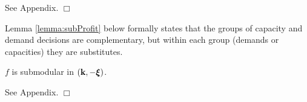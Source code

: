 \documentclass[mnsc,nonblindrev,copyedit]{informs2_wz} %
\newcommand{\proof}{\noindent{\bf Proof: } }
\newcommand{\qed}{ \hfill $\Box$ }
\newcommand{\OUT}[1]{}
\newcommand{\xiv}{\mbox{\boldmath$\xi$}}
\newcommand{\etav}{\mbox{\boldmath$\eta$}}
\newcommand{\lambdav}{\mbox{\boldmath$\lambda$}}
\newcommand{\alphav}{\mbox{\boldmath$\alpha$}}
\begin{document}
\proof See Appendix.  \qed

Lemma \ref{lemma:subProfit} below formally states that the groups of capacity and demand decisions are complementary, but within each group (demands or capacities) they are substitutes.


{\lemma $f$ is submodular in $(\bold k, -\xiv)$.
\label{lemma:subProfit}}

\proof See Appendix.  \qed

\OUT{
\proof For simplicity of the presentation, let $\alpha_{jl}$ be the coefficient of decision variable of objective function in (\ref{eqn:profit}), {\it i.e.}, $\alpha_{dd} = p-c, \; \alpha_{od} = p-cs-t,\; \alpha_{do} = sp -c -t, \; \alpha_{oo} = s(p-c)$.  To prove submodularity, we first write the dual of the production problem:
\begin{equation*}
\begin{array}{lll}
    f(s,\bold k, \xiv) &=& \min_{(\etav, \lambdav) \in B (\alphav)} G (\etav, \lambdav, \bold k ,\xiv)  \\
    G(\etav,\lambdav,\bold k, \xiv) &=& \etav \bold k + \lambdav \xiv \\
    B (\alphav) &=& \{\eta_j+\lambda_l  \leq \alpha_{jl} \; \forall j \in \{d,o\}, \; \forall l \in \{d,o\},\;  \etav \geq 0,\; \lambdav \geq 0 \}
\end{array}
\end{equation*}
To see the relationship between $\bold k$ and $-\xiv$, we substitute $\bar{\xiv} = - \xiv$ and $\bar{\etav} = - \etav$.  Then, the dual problem becomes:
\begin{equation*}
\begin{array}{lll}
    f(s,\bold k, \xiv) &=& \min_{(\bar{\etav}, \lambdav) \in B_1 (\alphav)} G (\bar{\etav}, \lambdav, \bold k ,\bar{\xiv})  \\
    G(\bar{\etav},\lambdav,\bold k, \bar{\xiv}) &=& -\bar{\etav} \bold k - \lambdav \bar{\xiv} \\
     B_1(\alphav) &=& \{-\bar{\eta}_j+\lambda_l  \leq \alpha_{jl} \; \forall j \in \{d,o\}, \; \forall l \in \{d,o\},\;  \bar{\etav} \leq 0,\; \lambdav \geq 0 \}
\end{array}
\end{equation*}
The objective function $G$ is submodular in $(\bar{\etav},\bold k,\lambdav, \bar{\xiv})$ and the constraint set $B_1$  is a sublattice of $(\bar{\etav},\lambdav)$.  Since minimizing submodular function over a sublattice preserves submodularity, $f$ is submodular in $(\bold{k}, -\xiv)$.  \qed
}
\end{document}
